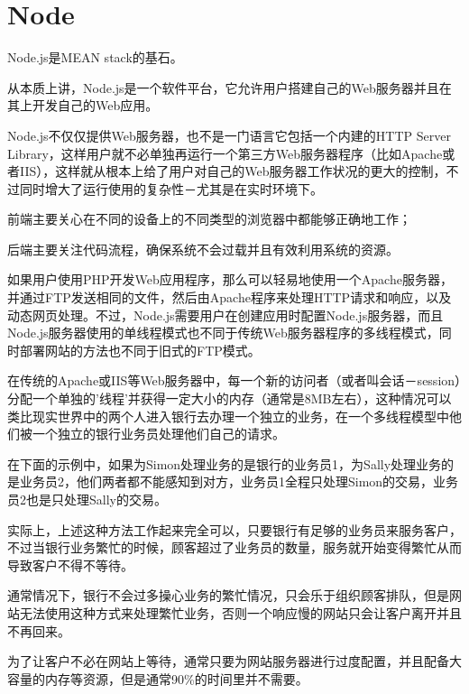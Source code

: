 \section{Node}


Node.js是MEAN stack的基石。

从本质上讲，Node.js是一个软件平台，它允许用户搭建自己的Web服务器并且在其上开发自己的Web应用。

Node.js不仅仅提供Web服务器，也不是一门语言它包括一个内建的HTTP Server Library，这样用户就不必单独再运行一个第三方Web服务器程序（比如Apache或者IIS），这样就从根本上给了用户对自己的Web服务器工作状况的更大的控制，不过同时增大了运行使用的复杂性－尤其是在实时环境下。


\begin{compactitem}
\item 前端主要关心在不同的设备上的不同类型的浏览器中都能够正确地工作；
\item 后端主要关注代码流程，确保系统不会过载并且有效利用系统的资源。
\end{compactitem}


如果用户使用PHP开发Web应用程序，那么可以轻易地使用一个Apache服务器，并通过FTP发送相同的文件，然后由Apache程序来处理HTTP请求和响应，以及动态网页处理。不过，Node.js需要用户在创建应用时配置Node.js服务器，而且Node.js服务器使用的单线程模式也不同于传统Web服务器程序的多线程模式，同时部署网站的方法也不同于旧式的FTP模式。



在传统的Apache或IIS等Web服务器中，每一个新的访问者（或者叫会话－session）分配一个单独的'线程'并获得一定大小的内存（通常是8MB左右），这种情况可以类比现实世界中的两个人进入银行去办理一个独立的业务，在一个多线程模型中他们被一个独立的银行业务员处理他们自己的请求。



在下面的示例中，如果为Simon处理业务的是银行的业务员1，为Sally处理业务的是业务员2，他们两者都不能感知到对方，业务员1全程只处理Simon的交易，业务员2也是只处理Sally的交易。

实际上，上述这种方法工作起来完全可以，只要银行有足够的业务员来服务客户，不过当银行业务繁忙的时候，顾客超过了业务员的数量，服务就开始变得繁忙从而导致客户不得不等待。

通常情况下，银行不会过多操心业务的繁忙情况，只会乐于组织顾客排队，但是网站无法使用这种方式来处理繁忙业务，否则一个响应慢的网站只会让客户离开并且不再回来。

为了让客户不必在网站上等待，通常只要为网站服务器进行过度配置，并且配备大容量的内存等资源，但是通常90\%的时间里并不需要。

